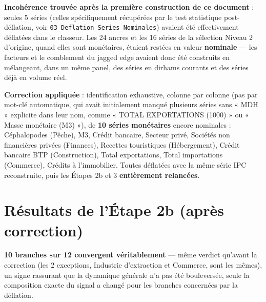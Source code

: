 \documentclass[11pt,a4paper]{article}
\begin{document}
\begin{alertebox}
\textbf{Incohérence trouvée après la première construction de ce document} : seules 5 séries (celles spécifiquement récupérées par le test statistique post-déflation, voir \texttt{03\_Deflation\_Series\_Nominales}) avaient été effectivement déflatées dans le classeur. Les 24 ancres et les 16 séries de la sélection Niveau 2 d'origine, quand elles sont monétaires, étaient restées en valeur \textbf{nominale} --- les facteurs et le comblement du jagged edge avaient donc été construits en mélangeant, dans un même panel, des séries en dirhams courants et des séries déjà en volume réel.

\textbf{Correction appliquée} : identification exhaustive, colonne par colonne (pas par mot-clé automatique, qui avait initialement manqué plusieurs séries sans « MDH » explicite dans leur nom, comme « TOTAL EXPORTATIONS (1000) » ou « Masse monétaire (M3) »), de \textbf{10 séries monétaires} encore nominales : Céphalopodes (Pêche), M3, Crédit bancaire, Secteur privé, Sociétés non financières privées (Finances), Recettes touristiques (Hébergement), Crédit bancaire BTP (Construction), Total exportations, Total importations (Commerce), Crédits à l'immobilier. Toutes déflatées avec la même série IPC reconstruite, puis les Étapes 2b et 3 \textbf{entièrement relancées}.
\end{alertebox}

\section{Résultats de l'Étape 2b (après correction)}

\begin{resultatbox}
\textbf{10 branches sur 12 convergent véritablement} --- même verdict qu'avant la correction (les 2 exceptions, Industrie d'extraction et Commerce, sont les mêmes), un signe rassurant que la dynamique générale n'a pas été bouleversée, seule la composition exacte du signal a changé pour les branches concernées par la déflation.
\end{resultatbox}
\end{document}
